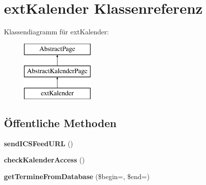 \hypertarget{classext_kalender}{}\section{ext\+Kalender Klassenreferenz}
\label{classext_kalender}
Klassendiagramm für ext\+Kalender\+:\begin{figure}[H]
\begin{center}
\leavevmode
\includegraphics[height=3.000000cm]{classext_kalender}
\end{center}
\end{figure}
\subsection*{Öffentliche Methoden}
\begin{DoxyCompactItemize}
\item 
\mbox{\label{classext_kalender_a4cd9f35267fcdef4b382a93a2aab708c}} 
{\bfseries send\+I\+C\+S\+Feed\+U\+RL} ()
\item 
\mbox{\label{classext_kalender_a216daff5129125db4cf341e909ded954}} 
{\bfseries check\+Kalender\+Access} ()
\item 
\mbox{\label{classext_kalender_a74063abc4352a1fe8930f9ea7c74cfa5}} 
{\bfseries get\+Termine\+From\+Database} (\$begin=\textquotesingle{}\textquotesingle{}, \$end=\textquotesingle{}\textquotesingle{})
\end{DoxyCompactItemize}
